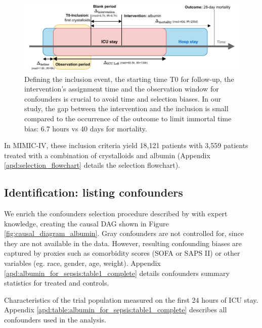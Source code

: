 \documentclass[french,12pt,twoside,a4paper]{book}
\begin{document}
\begin{figure}[h!]
  \centering
  \includegraphics[width=\linewidth]{img/chapter_4/timeline_albumin_for_sepsis.pdf}
  \caption{Defining the inclusion event, the starting time T0 for follow-up, the
    intervention's assignment time and the observation window for confounders is
    crucial to avoid time and selection biases. In our study, the gap
    between the intervention and the inclusion is small
    compared to the occurrence of the outcome to limit immortal time bias: 6.7 hours vs 40
    days for mortality.\label{fig:cohort_timeline_albumin}}
\end{figure}


In MIMIC-IV, these inclusion criteria yield 18,121 patients with 3,559 patients
treated with a combination of crystalloids and albumin (Appendix
\ref{apd:selection_flowchart} details the selection flowchart).


\subsection{Identification: listing confounders}%
\label{subsec:causal_tuto:confounders_mimic}%

We enrich the confounders selection procedure described by \cite{zhou2021early}
with expert knowledge, creating the causal DAG shown in Figure
\ref{fig:causal_diagram_albumin}. Gray confounders are not controlled for, since
they are not available in the data. However, resulting confounding biases are
captured by proxies such as comorbidity scores (SOFA or SAPS II) or other
variables (eg. race, gender, age, weight).
%
Appendix \ref{apd:albumin_for_sepsis:table1_complete} details confounders
summary statistics for treated and controls.


\begin{table}[!tb]
  \resizebox*{\textwidth}{!}{
  }
  \caption{Characteristics of the trial population measured on the first 24
    hours of ICU stay. Appendix \ref{apd:table:albumin_for_sepsis:table1_complete}
    describes all confounders used in the analysis.}\label{table:albumin_for_sepsis:table1_simple}
\end{table}
\end{document}
